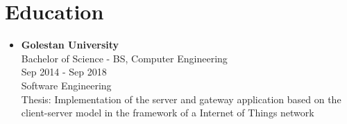 \section*{\LARGE{Education}}
\begin{itemize}
    \item \large{\textbf{Golestan University}\\}\normalsize{Bachelor of Science - BS, Computer Engineering\\Sep 2014 - Sep 2018\\Software Engineering\\Thesis: Implementation of the server and gateway application based on the client-server model in the framework of a Internet of Things network}
\end{itemize}